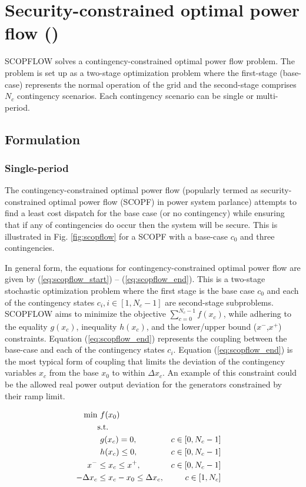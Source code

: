 \chapter{Security-constrained optimal power flow (\scopflow)}\label{chap:scopflow}
SCOPFLOW solves a contingency-constrained optimal power flow problem. The problem is set up as a two-stage optimization problem where the first-stage (base-case) represents the normal operation of the grid and the second-stage comprises $N_c$ contingency scenarios. Each contingency scenario can be single or multi-period.

\section{Formulation}

\subsection{Single-period}

The contingency-constrained optimal power flow (popularly termed as security-constrained optimal power flow (SCOPF) in power system parlance) attempts to find a least cost dispatch for the base case (or no contingency) while ensuring that if any of contingencies do occur then the system will be secure. This is illustrated in Fig. \ref{fig:scopflow} for a SCOPF with a base-case $c_0$ and three contingencies.



In general form, the equations for contingency-constrained optimal power flow are given by
(\ref{eq:scopflow_start}) -- (\ref{eq:scopflow_end}). This is a two-stage
stochastic optimization problem where the first stage is the base case $c_0$ and
each of the contingency states $c_i, i \in [1,N_c-1]$ are second-stage
subproblems. SCOPFLOW aims to minimize the objective $\sum_{c=0}^{N_c-1}f(x_c)$,
while adhering to the equality $g(x_c)$, inequality $h(x_c)$, and the
lower/upper bound ($x^-$,$x^+$) constraints. Equation (\ref{eq:scopflow_end})
represents the coupling between the base-case and each of the contingency states
$c_i$. Equation (\ref{eq:scopflow_end}) is the most typical form of coupling
that limits the deviation of the contingency variables $x_c$ from the base $x_0$
to within $\Delta x_c$. An example of this constraint could be the allowed real power output deviation for the generators constrained by their ramp limit.


\begin{align}
\centering
\text{min}&~f(x_0)&  \label{eq:scopflow_start}\\
&\text{s.t.}& \nonumber \\
&~g(x_c) = 0,                             &c \in \left[0,N_c-1\right]& \\
&~h(x_c) \le 0,                           &c \in \left[0,N_c-1\right]& \\
x^- & \le x_c \le x^+,                     &c\in \left[0,N_c-1\right]& \\
-\Delta x_c & \le x_c - x_0 \le \Delta x_c,&c \in \left[1,N_c\right]&
\label{eq:scopflow_end}
\end{align}

